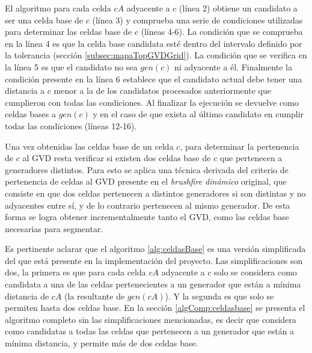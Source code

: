 El algoritmo para cada celda $cA$ adyacente a $c$ (línea 2) obtiene un
candidato a ser una celda base de $c$ (línea 3) y comprueba una serie de
condiciones utilizadas para determinar las celdas base de $c$ (líneas 4-6). La
condición que se comprueba en la línea 4 es que la celda base candidata esté
dentro del intervalo definido por la tolerancia (sección
\ref{subsec:mapaTopGVDGrid}). La condición que se verifica en la línea 5 es que
el candidato no sea $gen(c)$ ni adyacente a él. Finalmente la condición
presente en la línea 6 establece que el candidato actual debe tener una
distancia a $c$ menor a la de los candidatos procesados anteriormente que
cumplieron con todas las condiciones. Al finalizar la ejecución se devuelve como
celdas bases a $gen(c)$ y en el caso de que exista al último candidato en
cumplir todas las condiciones (líneas 12-16).



Una vez obtenidas las celdas base de un celda $c$, para determinar la
pertenencia de $c$ al GVD resta verificar si existen dos celdas base de $c$ que
pertenecen a generadores distintos. Para esto se aplica una técnica derivada del
criterio de pertenencia de celdas al GVD presente en el \emph{brushfire
dinámico} original, que consiste en que dos celdas pertenecen a distintos
generadores si son distintas y no adyacentes entre sí, y de lo contrario
pertenecen al mismo generador. 
De esta forma se logra obtener incrementalmente tanto el GVD, como las celdas
base necesarias para segmentar.

Es pertinente aclarar que el algoritmo \ref{alg:celdasBase} es una versión
simplificada del que está presente en la implementación del proyecto. Las
simplificaciones son dos, la primera es que para cada celda $cA$ adyacente a
$c$ solo se considera como candidata a una de las celdas pertenecientes a un
generador que están a mínima distancia de $cA$ (la resultante de $gen(cA)$). Y
la segunda es que solo se permiten hasta dos celdas base. En la sección
\ref{algComp:celdasbase} se presenta el algoritmo completo sin las
simplificaciones mencionadas, es decir que considera como candidatas a todas
las celdas que pertenecen a un generador que están a mínima distancia,
y permite más de dos celdas base.

